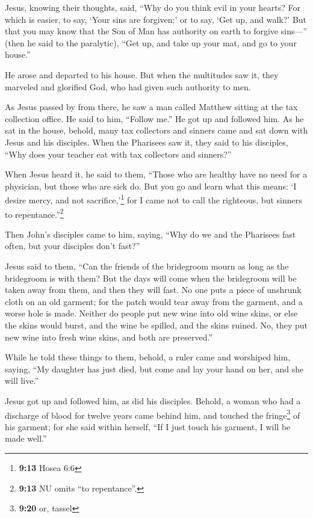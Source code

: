  Jesus, knowing their thoughts, said, ``Why do you think
evil in your hearts?  For which is easier, to say, `Your
sins are forgiven;' or to say, `Get up, and walk?'  But
that you may know that the Son of Man has authority on earth to forgive
sins---'' (then he said to the paralytic), ``Get up, and take up your
mat, and go to your house.''

 He arose and departed to his house.  But
when the multitudes saw it, they marveled and glorified God, who had
given such authority to men.

 As Jesus passed by from there, he saw a man called
Matthew sitting at the tax collection office. He said to him, ``Follow
me.'' He got up and followed him.  As he sat in the
house, behold, many tax collectors and sinners came and sat down with
Jesus and his disciples.  When the Pharisees saw it, they
said to his disciples, ``Why does your teacher eat with tax collectors
and sinners?''

 When Jesus heard it, he said to them, ``Those who are
healthy have no need for a physician, but those who are sick do.
 But you go and learn what this means: `I desire mercy,
and not sacrifice,'\footnote{\textbf{9:13} Hosea 6:6} for I came not to
call the righteous, but sinners to repentance.''\footnote{\textbf{9:13}
  NU omits ``to repentance''.}

 Then John's disciples came to him, saying, ``Why do we
and the Pharisees fast often, but your disciples don't fast?''

 Jesus said to them, ``Can the friends of the bridegroom
mourn as long as the bridegroom is with them? But the days will come
when the bridegroom will be taken away from them, and then they will
fast.  No one puts a piece of unshrunk cloth on an old
garment; for the patch would tear away from the garment, and a worse
hole is made.  Neither do people put new wine into old
wine skins, or else the skins would burst, and the wine be spilled, and
the skins ruined. No, they put new wine into fresh wine skins, and both
are preserved.''

 While he told these things to them, behold, a ruler came
and worshiped him, saying, ``My daughter has just died, but come and lay
your hand on her, and she will live.''

 Jesus got up and followed him, as did his disciples.
 Behold, a woman who had a discharge of blood for twelve
years came behind him, and touched the fringe\footnote{\textbf{9:20} or,
  tassel} of his garment;  for she said within herself,
``If I just touch his garment, I will be made well.''

